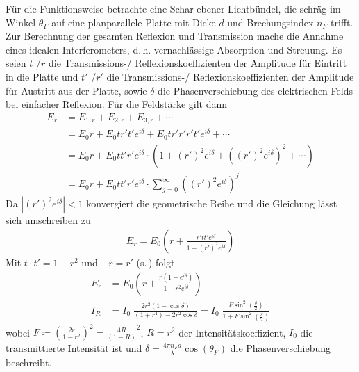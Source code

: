 Für die Funktionsweise betrachte eine Schar ebener Lichtbündel, die
schräg im Winkel
$\theta_F$
auf eine planparallele Platte mit Dicke $d$ und Brechungsindex $n_F$
trifft.
Zur Berechnung der gesamten Reflexion und Transmission mache die
Annahme eines idealen Interferometers, d.\,h. vernachlässige
Absorption und Streuung.
Es seien 
$t$%
%
/$r$%
die Transmissions-/ Reflexionskoeffizienten der
Amplitude für Eintritt in die Platte
und $t'$%
%
/$r'$%
die Transmissions-/ Reflexionskoeffizienten der
Amplitude für Austritt aus der Platte,
sowie $\delta$%
die Phasenverschiebung des elektrischen Felds bei einfacher Reflexion.
Für die Feldstärke gilt dann
\begin{align*}
  E_r &= E_{1,r} + E_{2,r} + E_{3,r} + \dotsb \\
      &= E_0r + E_0tr't'e^{i\delta} + E_0tr'r'r't'e^{i\delta} +
        \dotsb \\
      &= E_0r + E_0tt'r'e^{i\delta}\cdot\left(
        1 + {(r')}^{2}e^{i\delta} 
        + \left( {(r')}^{2}e^{i\delta} \right)^2 + \dotsb
        \right)\\
      &= E_0r + E_0tt'r'e^{i\delta}\cdot 
        \sum_{j=0}^{\infty}\left( {(r')}^{2}e^{i\delta} \right)^{j}
\end{align*}
Da $\left|(r')^2e^{i\delta}\right|<1$ konvergiert die geometrische
Reihe und die Gleichung lässt sich umschreiben zu
\begin{gather*}
  E_r = E_0\left( 
    r + \frac{r'tt'e^{i\delta}}{1-(r')^2e^{i\delta}} 
  \right)
\end{gather*}
Mit $t\cdot t' = 1-r^2$ und $-r=r'$ (s.\,) folgt
\begin{align*}
  E_r &= E_0\left( 
        r + \frac{r(1-e^{i\delta})}{1-r^2e^{i\delta}} 
        \right)\\
  I_R &= I_0\;\frac{2r^2(1-\cos\delta)}{(1+r^4)-2r^2\cos\delta} 
        = I_0\;\frac
        {F\sin^2\left(\frac{\delta}{2}\right)}
        {1+F\sin^2\left(\frac{\delta}{2}\right)}
\end{align*}
wobei $F\coloneqq \left(\frac{2r}{1-r^2}\right)^2 
= \frac{4R}{(1-R)}^2$,
$R=r^2$ der Intensitätskoeffizient,
$I_0$ die transmittierte Intensität
ist und
$\delta = \frac{4\pi n_F d}{\lambda}\cos(\theta_F)$
die Phasenverschiebung beschreibt.

